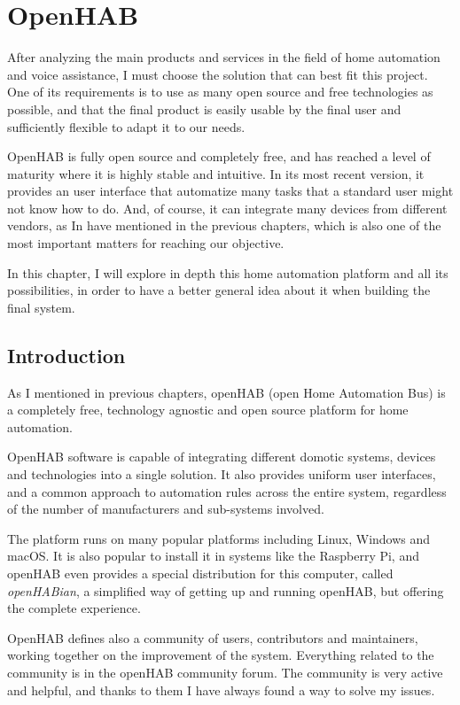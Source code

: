 \chapter{OpenHAB}

After analyzing the main products and services in the field of home automation and voice assistance, I must choose the solution
that can best fit this project. One of its requirements is to use as many open source and free technologies as possible, and that
the final product is easily usable by the final user and sufficiently flexible to adapt it to our needs.

OpenHAB is fully open source and completely free, and has reached a level of maturity where it is highly stable and intuitive. In its
most recent version, it provides an user interface that automatize many tasks that a standard user might not know how to do. And,
of course, it can integrate many devices from different vendors, as In have mentioned in the previous chapters, which is also one of
the most important matters for reaching our objective.

In this chapter, I will explore in depth this home automation platform and all its possibilities, in order to have a better general idea
about it when building the final system.

\section{Introduction}
As I mentioned in previous chapters, openHAB (open Home Automation Bus) is a completely free, technology agnostic and open
source platform for home automation. 

OpenHAB software is capable of integrating different domotic systems, devices and technologies into a single solution. It also
provides uniform user interfaces, and a common approach to automation rules across the entire system, regardless of the number
of manufacturers and sub-systems involved.\cite{openHABDocs}

The platform runs on many popular platforms including Linux, Windows and macOS. It is also popular to install it in systems like the
Raspberry Pi, and openHAB even provides a special distribution for this computer, called \textit{openHABian}, a simplified way of
getting up and running openHAB, but offering the complete experience.

OpenHAB defines also a community of users, contributors and maintainers, working together on the improvement of the system.
Everything related to the community is in the openHAB community forum. The community is very active and helpful, and thanks
to them I have always found a way to solve my issues.

